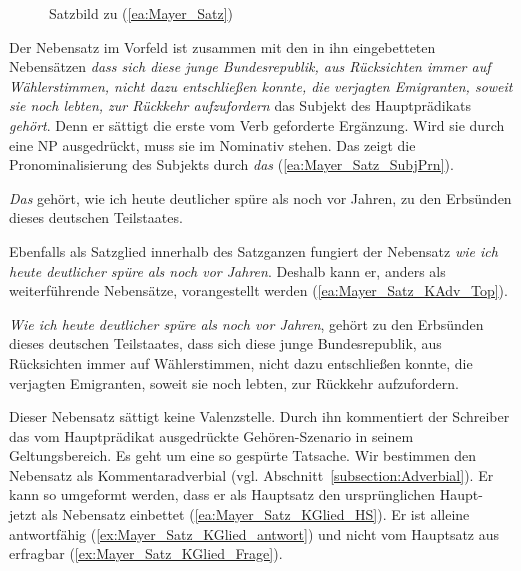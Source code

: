 \begin{figure}
    \centering
    
    \caption{Satzbild zu (\ref{ea:Mayer_Satz})}
    \label{Abb:Satzbild_Mayer}
\end{figure}

Der Nebensatz im Vorfeld ist zusammen mit den in ihn eingebetteten Nebensätzen \textit{dass sich diese junge Bundesrepublik, aus Rücksichten immer auf Wählerstimmen, nicht dazu entschließen konnte, die verjagten Emigranten, soweit sie noch lebten, zur Rückkehr aufzufordern} das Subjekt des Hauptprädikats \textit{gehört}. Denn er sättigt die erste vom Verb geforderte Ergänzung. Wird sie durch eine NP ausgedrückt, muss sie im Nominativ stehen. Das zeigt die Pronominalisierung des Subjekts durch \textit{das} (\ref{ea:Mayer_Satz_SubjPrn}).

\ea \label{ea:Mayer_Satz_SubjPrn} \textit{Das} gehört, wie ich heute deutlicher spüre als noch vor Jahren, zu den Erbsünden dieses deutschen Teilstaates.
\z 

Ebenfalls als Satzglied innerhalb des Satzganzen fungiert der Nebensatz \textit{wie ich heute deutlicher spüre als noch vor Jahren}. Deshalb kann er, anders als weiterführende Nebensätze, vorangestellt werden (\ref{ea:Mayer_Satz_KAdv_Top}).

\ea \label{ea:Mayer_Satz_KAdv_Top} \textit{Wie ich heute deutlicher spüre als noch vor Jahren}, gehört zu den Erbsünden dieses deutschen Teilstaates, dass sich diese junge Bundesrepublik, aus Rücksichten immer auf Wählerstimmen, nicht dazu entschließen konnte, die verjagten Emigranten, soweit sie noch lebten, zur Rückkehr aufzufordern.
\z 

Dieser Nebensatz sättigt keine Valenzstelle. Durch ihn kommentiert der Schreiber das vom Hauptprädikat ausgedrückte Gehören-Szenario in seinem Geltungsbereich. Es geht um eine so gespürte Tatsache. Wir bestimmen den Nebensatz als Kommentaradverbial (vgl. Abschnitt~\ref{subsection:Adverbial}). Er kann so umgeformt werden, dass er als Hauptsatz den ursprünglichen Haupt- jetzt als Nebensatz einbettet (\ref{ea:Mayer_Satz_KGlied_HS}). Er ist alleine antwortfähig (\ref{ex:Mayer_Satz_KGlied_antwort}) und nicht vom Hauptsatz aus erfragbar (\ref{ex:Mayer_Satz_KGlied_Frage}).

